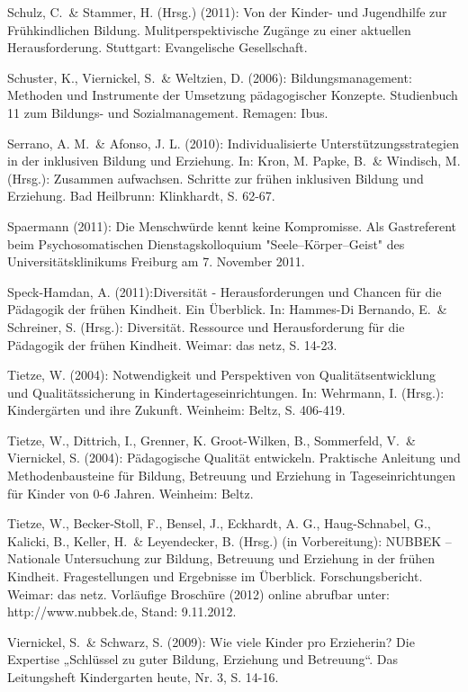 Schulz, C.~\& Stammer, H. (Hrsg.) (2011): Von der Kinder- und Jugendhilfe zur Frühkindlichen Bildung. Mulitperspektivische Zugänge zu einer aktuellen Herausforderung. Stuttgart: Evangelische Gesellschaft.

Schuster, K., Viernickel, S.~\& Weltzien, D. (2006): Bildungsmanagement: Methoden und Instrumente der Umsetzung pädagogischer Konzepte. Studienbuch 11 zum Bildungs- und Sozialmanagement. Remagen: Ibus.

Serrano, A. M.~\& Afonso, J. L. (2010): Individualisierte Unterstützungsstrategien in der inklusiven Bildung und Erziehung. In: Kron, M. Papke, B.~\& Windisch, M. (Hrsg.): Zusammen aufwachsen. Schritte zur frühen inklusiven Bildung und Erziehung. Bad Heilbrunn: Klinkhardt, S. 62-67.

Spaermann (2011): Die Menschwürde kennt keine Kompromisse. Als Gastreferent beim Psychosomatischen Dienstagskolloquium "Seele–Körper–Geist" des Universitätsklinikums Freiburg am 7. November 2011.

Speck-Hamdan, A. (2011):Diversität - Herausforderungen und Chancen für die Pädagogik der frühen Kindheit. Ein Überblick. In: Hammes-Di Bernando, E.~\& Schreiner, S. (Hrsg.): Diversität. Ressource und Herausforderung für die Pädagogik der frühen Kindheit. Weimar: das netz, S. 14-23.

Tietze, W. (2004): Notwendigkeit und Perspektiven von Qualitätsentwicklung und Qualitätssicherung in Kindertageseinrichtungen. In: Wehrmann, I. (Hrsg.): Kindergärten und ihre Zukunft. Weinheim: Beltz, S. 406-419.

Tietze, W., Dittrich, I., Grenner, K. Groot-Wilken, B., Sommerfeld, V.~\& Viernickel, S. (2004): Pädagogische Qualität entwickeln. Praktische Anleitung und Methodenbausteine für Bildung, Betreuung und Erziehung in Tageseinrichtungen für Kinder von 0-6 Jahren. Weinheim: Beltz.

Tietze, W., Becker-Stoll, F., Bensel, J., Eckhardt, A. G., Haug-Schnabel, G., Kalicki, B., Keller, H.~\& Leyendecker, B. (Hrsg.) (in Vorbereitung): NUBBEK -- Nationale Untersuchung zur Bildung, Betreuung und Erziehung in der frühen Kindheit.
Fragestellungen und Ergebnisse im Überblick. Forschungsbericht. Weimar: das netz. Vorläufige Broschüre (2012) online abrufbar unter: http://www.nubbek.de, Stand:  9.11.2012.

Viernickel, S.~\& Schwarz, S. (2009): Wie viele Kinder pro Erzieherin? Die Expertise „Schlüssel zu guter Bildung, Erziehung und Betreuung“. Das Leitungsheft Kindergarten heute, Nr. 3, S. 14-16.

